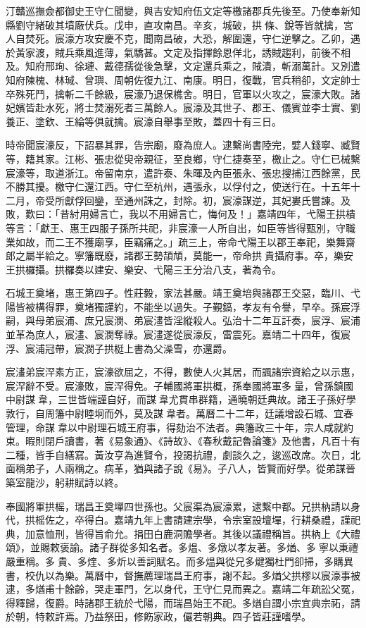 汀贛巡撫僉都御史王守仁聞變，與吉安知府伍文定等檄諸郡兵先後至。乃使奉新知縣劉守緒破其墳廠伏兵。戊申，直攻南昌。辛亥，城破，拱條、銳等皆就擒，宮人自焚死。宸濠方攻安慶不克，聞南昌破，大恐，解圍還，守仁逆擊之。乙卯，遇於黃家渡，賊兵乘風進薄，氣驕甚。文定及指揮餘恩佯北，誘賊趨利，前後不相及。知府邢珣、徐璉、戴德孺從後急擊，文定還兵乘之，賊潰，斬溺萬計。又別遣知府陳槐、林瑊、曾璵、周朝佐復九江、南康。明日，復戰，官兵稍卻，文定帥士卒殊死鬥，擒斬二千餘級，宸濠乃退保樵舍。明日，官軍以火攻之，宸濠大敗。諸妃嬪皆赴水死，將士焚溺死者三萬餘人。宸濠及其世子、郡王、儀賓並李士實、劉養正、塗欽、王綸等俱就擒。宸濠自舉事至敗，蓋四十有三日。

時帝聞宸濠反，下詔暴其罪，告宗廟，廢為庶人。逮繫尚書陸完，嬖人錢寧、臧賢等，籍其家。江彬、張忠從臾帝親征，至良鄉，守仁捷奏至，檄止之。守仁已械繫宸濠等，取道浙江。帝留南京，遣許泰、朱暉及內臣張永、張忠搜捕江西餘黨，民不勝其擾。檄守仁還江西。守仁至杭州，遇張永，以俘付之，使送行在。十五年十二月，帝受所獻俘回鑾，至通州誅之，封除。初，宸濠謀逆，其妃婁氏嘗諫。及敗，歎曰：「昔紂用婦言亡，我以不用婦言亡，悔何及！」嘉靖四年，弋陽王拱樻等言：「獻王、惠王四服子孫所共祀，非宸濠一人所自出，如臣等皆得甄別，守職業如故，而二王不獲廟享，臣竊痛之。」疏三上，帝命弋陽王以郡王奉祀，樂舞齋郎之屬半給之。寧籓既廢，諸郡王勢頡頏，莫能一，帝命拱貴攝府事。卒，樂安王拱欏攝。拱欏奏以建安、樂安、弋陽三王分治八支，著為令。

石城王奠堵，惠王第四子。性莊毅，家法甚嚴。靖王奠培與諸郡王交惡，臨川、弋陽皆被構得罪，奠堵獨謹約，不能坐以過失。子覲鎬，孝友有令譽，早卒。孫宸浮嗣，與母弟宸浦、庶兄宸潣、弟宸澅皆淫縱殺人。弘治十二年互訐奏，宸浮、宸浦並革為庶人，宸澅、宸潣奪祿。宸澅遂從宸濠反，雷震死。嘉靖二十四年，復宸浮、宸浦冠帶，宸潣子拱梃上書為父澡雪，亦還爵。

宸澅弟宸浫素方正，宸濠欲屈之，不得，數使人火其居，而諷諸宗資給之以示惠，宸浫辭不受。宸濠敗，宸浫得免。子輔國將軍拱概，孫奉國將軍多量，曾孫鎮國中尉謀韋，三世皆端謹自好，而謀韋尤貫串群籍，通曉朝廷典故。諸王子孫好學敦行，自周籓中尉睦坰而外，莫及謀韋者。萬曆二十二年，廷議增設石城、宜春管理，命謀韋以中尉理石城王府事，得劾治不法者。典籓政三十年，宗人咸就約束。暇則閉戶讀書，著《易象通》、《詩故》、《春秋戴記魯論箋》及他書，凡百十有二種，皆手自繕寫。黃汝亨為進賢令，投謁抗禮，劇談久之，逡巡改席。次日，北面稱弟子，人兩稱之。病革，猶與諸子說《易》。子八人，皆賢而好學。從弟謀晉築室龍沙，躬耕賦詩以終。

奉國將軍拱榣，瑞昌王奠墠四世孫也。父宸渠為宸濠累，逮繫中都。兄拱枘請以身代，拱榣佐之，卒得白。嘉靖九年上書請建宗學，令宗室設壇墠，行耕桑禮，謹祀典，加意恤刑，皆得旨俞允。捐田白鹿洞贍學者。其後以議禮稱旨。拱枘上《大禮頌》，並賜敕褒諭。諸子群從多知名者。多煴、多燉以孝友著。多煪、多寧以秉禮嚴重稱。多貴、多煃、多炘以善詞賦名。而多煴與從兄多煡獨杜門卻掃，多購異書，校仇以為樂。萬曆中，督撫薦理瑞昌王府事，謝不起。多煪父拱樛以宸濠事被逮，多煪甫十餘齡，哭走軍門，乞以身代，王守仁見而異之。嘉靖二年疏訟父冤，得釋歸，復爵。時諸郡王統於弋陽，而瑞昌始王不祀。多煪自謂小宗宜典宗祏，請於朝，特敕許焉。乃益祭田，修飭家政，儼若朝典。四子皆莊謹嗜學。

